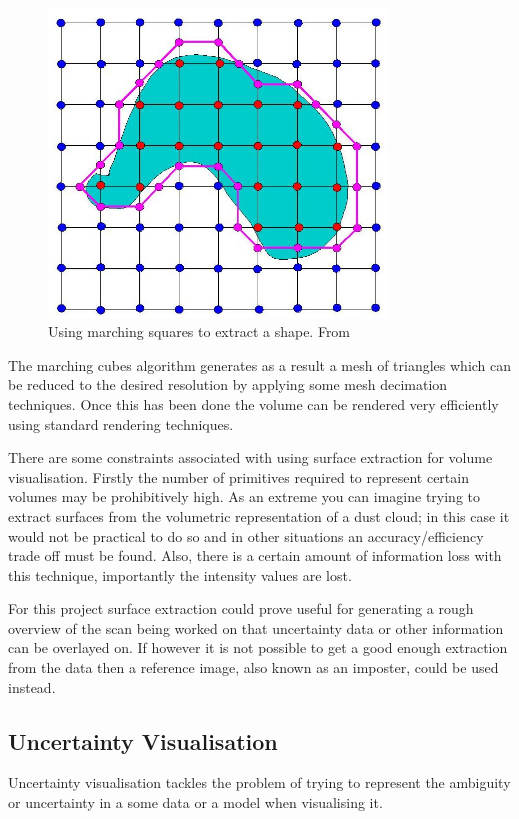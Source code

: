 \documentclass[
  oneside,
  11pt, a4paper,
  footinclude=true,
  headinclude=true,
  cleardoublepage=empty
]{scrbook}
\begin{document}
\begin{figure}[h]
    \centering
	\includegraphics[width=0.8\textwidth]{images/marching_squares.jpg}
    \caption{Using marching squares to extract a shape. From \cite{marching_squares:image}}
    \label{fig:marching_squares}
\end{figure}

The marching cubes algorithm generates as a result a mesh of triangles which can be reduced to the desired resolution by applying some mesh decimation techniques. Once this has been done the volume can be rendered very efficiently using standard rendering techniques.

There are some constraints associated with using surface extraction for volume visualisation. Firstly the number of primitives required to represent certain volumes may be prohibitively high. As an extreme you can imagine trying to extract surfaces from the volumetric representation of a dust cloud; in this case it would not be practical to do so and in other situations an accuracy/efficiency trade off must be found. Also, there is a certain amount of information loss with this technique, importantly the intensity values are lost.

For this project surface extraction could prove useful for generating a rough overview of the scan being worked on that uncertainty data or other information can be overlayed on. If however it is not possible to get a good enough extraction from the data then a reference image, also known as an imposter, could be used instead.

\newpage
\subsection{Uncertainty Visualisation\cite{uncertaintyoverview}}
Uncertainty visualisation tackles the problem of trying to represent the ambiguity or uncertainty in a some data or a model when visualising it.
\end{document}
